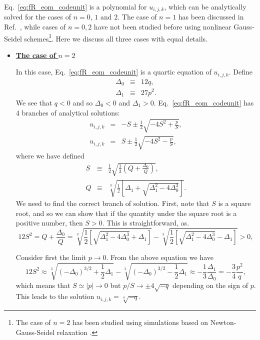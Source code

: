 Eq.~\eqref{eq:fR_eom_codeunit} is a polynomial for $u_{i,j,k}$, which can be analytically solved for the cases of $n=0$, $1$ and $2$. The case of $n=1$ has been discussed in Ref.~\cite{Bose:2016wms}, while cases of $n=0,2$ have not been studied before using nonlinear Gauss-Seidel schemes\footnote{The case of $n=2$ has been studied using simulations based on Newton-Gauss-Seidel relaxation \cite[e.g.,][]{Li:2011uw}.}. Here we discuss all three cases with equal details.

\begin{itemize}
    \item {\underline{\textbf{The case of} $n=2$}} 

    In this case, Eq.~\eqref{eq:fR_eom_codeunit} is a quartic equation of $u_{i,j,k}$. Define 
    \begin{eqnarray}
    \Delta_0 &\equiv& 12q,\nonumber\\ 
    \Delta_1 &\equiv& 27p^2.
    \end{eqnarray} 
    We see that $q<0$ and so $\Delta_0<0$ and $\Delta_1>0$. Eq.~\eqref{eq:fR_eom_codeunit} has 4 branches of analytical solutions:
    \begin{eqnarray}
    \label{eq:branch1}u_{i,j,k} &=& -S \pm \frac{1}{2}\sqrt{-4S^2+\frac{p}{S}},\\
    \label{eq:branch2}u_{i,j,k} &=&  S \pm \frac{1}{2}\sqrt{-4S^2-\frac{p}{S}},
    \end{eqnarray}
    where we have defined
    \begin{eqnarray}
    S &\equiv& \frac{1}{2}\sqrt{\frac{1}{3}\left(Q+\frac{\Delta_0}{Q}\right)},\nonumber\\
    Q &\equiv& \sqrt[3]{\frac{1}{2}\left[\Delta_1+\sqrt{\Delta_1^2-4\Delta_0^3}\right]}.
    \end{eqnarray}
    We need to find the correct branch of solution. First, note that $S$ is a square root, and so we can show that if the quantity under the square root is a positive number, then $S>0$. This is straightforward, as.
    \begin{equation}
    12S^2 = Q + \frac{\Delta_0}{Q} = \sqrt[3]{\frac{1}{2}\left[\sqrt{\Delta_1^2-4\Delta_0^3}+\Delta_1\right]} - \sqrt[3]{\frac{1}{2}\left[\sqrt{\Delta_1^2-4\Delta_0^3}-\Delta_1\right]} > 0,
    \end{equation}
    
    Consider first the limit $p\rightarrow0$. From the above equation we have
    \begin{equation}
    12S^2 \approx \sqrt[3]{\left(-\Delta_0\right)^{3/2}+\frac{1}{2}\Delta_1} - \sqrt[3]{\left(-\Delta_0\right)^{3/2}-\frac{1}{2}\Delta_1} \approx -\frac{1}{3}\frac{\Delta_1}{\Delta_0} = -\frac{3}{4}\frac{p^2}{q},
    \end{equation}
    which means that $S\simeq |p|\rightarrow0$ but $p/S \rightarrow \pm4\sqrt{-q}$ depending on the sign of $p$. This leads to the solution $u_{i,j,k}=\sqrt[4]{-q}$.
    

\end{itemize}
